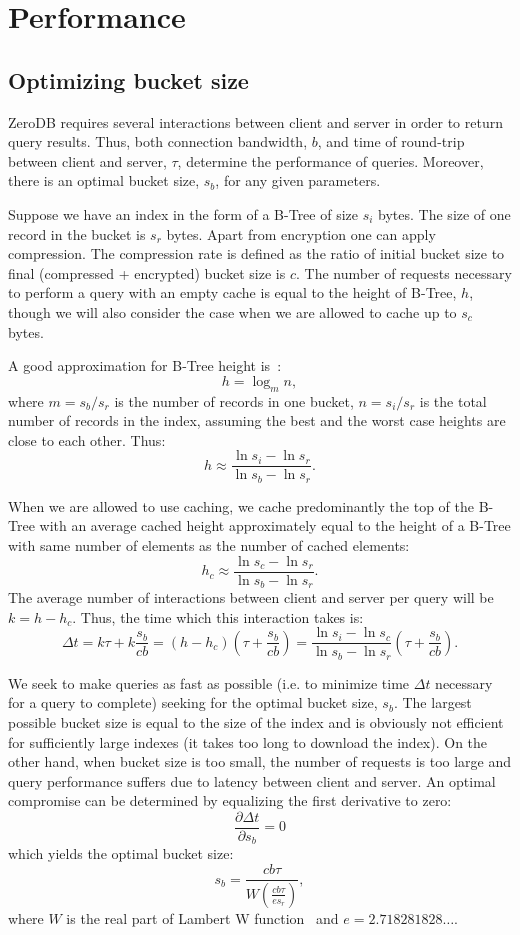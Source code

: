 \documentclass[notitlepage,longbibliography]{revtex4-1}
\begin{document}
\section{Performance}

\subsection{Optimizing bucket size}


ZeroDB requires several interactions between client and server in order to return query results.
Thus, both connection bandwidth, $b$, and time of round-trip between client and server, $\tau$, determine the performance of queries.
Moreover, there is an optimal bucket size, $s_b$, for any given parameters.

Suppose we have an index in the form of a B-Tree of size $s_i$ bytes.
The size of one record in the bucket is $s_r$ bytes.
Apart from encryption one can apply compression.
The compression rate is defined as the ratio of initial bucket size to final (compressed + encrypted) bucket size is $c$.
The number of requests necessary to perform a query with an empty cache is equal to the height of B-Tree, $h$, though we will also consider the case when we are allowed to cache up to $s_c$ bytes.


A good approximation for B-Tree height is~\cite{wiki:b-tree}:
$$h = \log_m n,$$
where $m = s_b/s_r$ is the number of records in one bucket,
$n = s_i/s_r$ is the total number of records in the index,
assuming the best and the worst case heights are close to each other.
Thus:
$$h \approx \frac{\ln s_i - \ln s_r}{\ln s_b - \ln s_r}.$$

When we are allowed to use caching, we cache predominantly the top of the B-Tree with an average cached height approximately equal to the height of a B-Tree with same number of elements as the number of cached elements:
$$h_c \approx \frac{\ln s_c - \ln s_r}{\ln s_b - \ln s_r}.$$
The average number of interactions between client and server per query will be $k = h - h_c$.
Thus, the time which this interaction takes is:
$$\Delta t = k\tau + k\frac{s_b}{cb} =
\left(h - h_c \right) \left( \tau + \frac{s_b}{cb} \right) =
\frac{\ln s_i - \ln s_c}{\ln s_b - \ln s_r} \left( \tau + \frac{s_b}{cb} \right).$$

We seek to make queries as fast as possible (i.e. to minimize time $\Delta t$ necessary for a query to complete) seeking for the optimal bucket size, $s_b$.
The largest possible bucket size is equal to the size of the index and is obviously not efficient for sufficiently large indexes (it takes too long to download the index).
On the other hand, when bucket size is too small, the number of requests is too large and query performance suffers due to latency between client and server.
An optimal compromise can be determined by equalizing the first derivative to zero:
$$\frac{\partial \Delta t}{\partial s_b} = 0$$
which yields the optimal bucket size:
$$s_b = \frac{cb\tau}{W\left( \frac{cb\tau}{e s_r}\right)},$$
where $W$ is the real part of Lambert W function~\cite{wiki:lambert}
and $e=2.718281828\ldots$.
\end{document}
